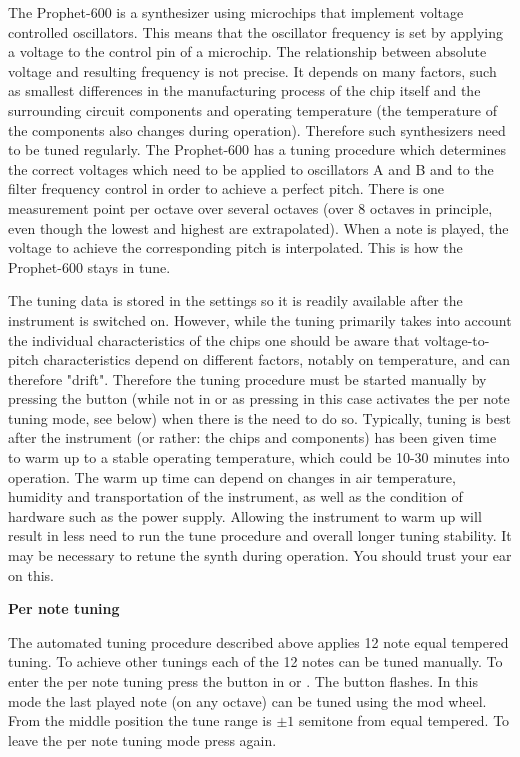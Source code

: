 The Prophet-600 is a synthesizer using microchips that implement voltage controlled oscillators. This means that the oscillator frequency is set by applying a voltage to the control pin of a microchip. The relationship between absolute voltage and resulting frequency is not precise. It depends on many factors, such as smallest differences in the manufacturing process of the chip itself and the surrounding circuit components and operating temperature (the temperature of the components also changes during operation). Therefore such synthesizers need to be tuned regularly.  The Prophet-600 has a tuning procedure which determines the correct voltages which need to be applied to oscillators A and B and to the filter frequency control in order to achieve a perfect pitch. There is one measurement point per octave over several octaves (over 8 octaves in principle, even though the lowest and highest are extrapolated). When a note is played, the voltage to achieve the corresponding pitch is interpolated. This is how the Prophet-600 stays in tune. 

The tuning data is stored in the settings so it is readily available after the instrument is switched on. However, while the tuning primarily takes into account the individual characteristics of the chips one should be aware that voltage-to-pitch characteristics depend on different factors, notably on temperature, and can therefore "drift". Therefore the tuning procedure must be started manually by pressing the \tune button (while not in \shiftmode or \shiftlock as pressing \tune in this case activates the per note tuning mode, see below) when there is the need to do so. Typically, tuning is best after the instrument (or rather: the chips and components) has been given time to warm up to a stable operating temperature, which could be 10-30 minutes into operation. The warm up time can depend on changes in air temperature, humidity and transportation of the instrument, as well as the condition of hardware such as the power supply.  Allowing the instrument to warm up will result in less need to run the tune procedure and overall longer tuning stability. It may be necessary to retune the synth during operation. You should trust your ear on this.

\textbf{Per note tuning}

The automated tuning procedure described above applies 12 note equal tempered tuning. To achieve other tunings each of the 12 notes can be tuned manually. To enter the per note tuning press the \tune button in \shiftmode or \shiftlock. The \tune button flashes. In this mode the last played note (on any octave) can be tuned using the mod wheel. From the middle position the tune range is $\pm 1$ semitone from equal tempered. To leave the per note tuning mode press \tune again.

